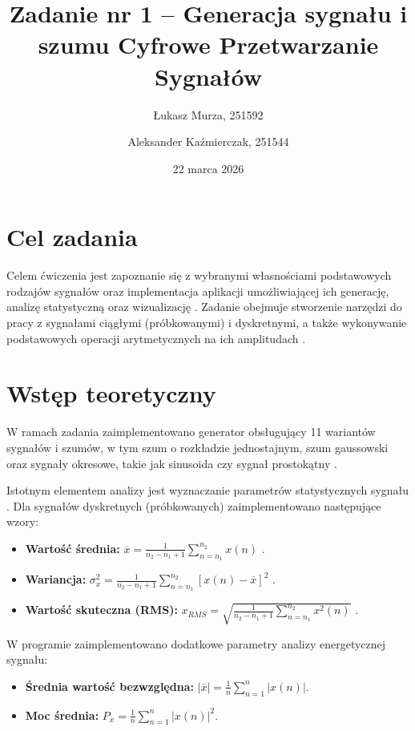 \documentclass[12pt]{article}
\title{{\bf Zadanie nr 1 -- Generacja sygnału i szumu}\linebreak
Cyfrowe Przetwarzanie Sygnałów}
\author{Łukasz Murza, 251592 \and Aleksander Kaźmierczak, 251544}
\date{22 marca 2026}
\begin{document}
\maketitle
\thispagestyle{empty}
\newpage
\setcounter{page}{1}

\section{Cel zadania}
Celem ćwiczenia jest zapoznanie się z wybranymi własnościami podstawowych rodzajów sygnałów oraz implementacja aplikacji umożliwiającej ich generację, analizę statystyczną oraz wizualizację \cite{1}. Zadanie obejmuje stworzenie narzędzi do pracy z sygnałami ciągłymi (próbkowanymi) i dyskretnymi, a także wykonywanie podstawowych operacji arytmetycznych na ich amplitudach \cite{1}.

\section{Wstęp teoretyczny}
W ramach zadania zaimplementowano generator obsługujący 11 wariantów sygnałów i szumów, w tym szum o rozkładzie jednostajnym, szum gaussowski oraz sygnały okresowe, takie jak sinusoida czy sygnał prostokątny \cite{1}. 

Istotnym elementem analizy jest wyznaczanie parametrów statystycznych sygnału \cite{1}. Dla sygnałów dyskretnych (próbkowanych) zaimplementowano następujące wzory:
\begin{itemize}
    \item \textbf{Wartość średnia:} $\overline{x}=\frac{1}{n_{2}-n_{1}+1}\sum_{n=n_{1}}^{n_{2}}x(n)$ \cite{1}.
    \item \textbf{Wariancja:} $\sigma_{x}^{2}=\frac{1}{n_{2}-n_{1}+1}\sum_{n=n_{1}}^{n_{2}}[x(n)-\overline{x}]^{2}$ \cite{1}.
    \item \textbf{Wartość skuteczna (RMS):} $x_{RMS}=\sqrt{\frac{1}{n_{2}-n_{1}+1}\sum_{n=n_{1}}^{n_{2}}x^{2}(n)}$ \cite{1}.
\end{itemize}

W programie zaimplementowano dodatkowe parametry analizy energetycznej sygnału:
\begin{itemize}
    \item \textbf{Średnia wartość bezwzględna:} $|\overline{x}| = \frac{1}{n} \sum_{n=1}^{n} |x(n)|$.
    \item \textbf{Moc średnia:} $P_x = \frac{1}{n} \sum_{n=1}^{n} |x(n)|^2$.
\end{itemize}
\end{document}
